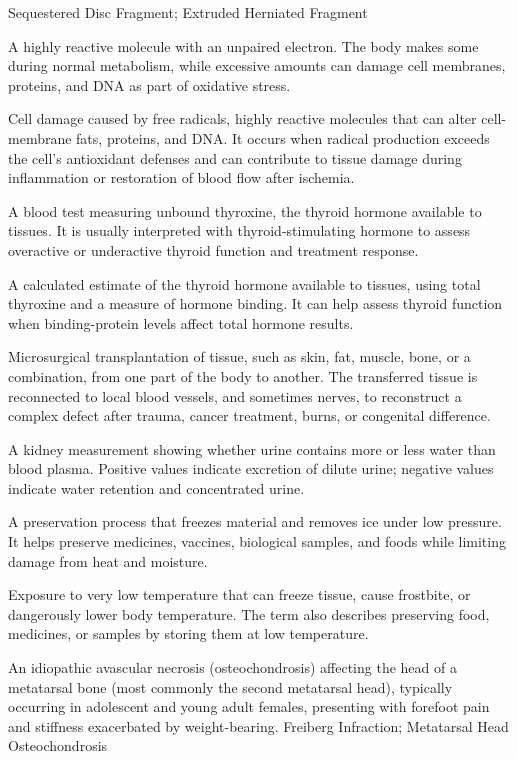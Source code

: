\synonyms
Sequestered Disc Fragment; Extruded Herniated Fragment

 A highly reactive molecule with an unpaired electron. The body makes some during normal metabolism, while excessive amounts can damage cell membranes, proteins, and DNA as part of oxidative stress.

 Cell damage caused by free radicals, highly reactive molecules that can alter cell-membrane fats, proteins, and DNA. It occurs when radical production exceeds the cell's antioxidant defenses and can contribute to tissue damage during inflammation or restoration of blood flow after ischemia.

 A blood test measuring unbound thyroxine, the thyroid hormone available to tissues. It is usually interpreted with thyroid-stimulating hormone to assess overactive or underactive thyroid function and treatment response.

 A calculated estimate of the thyroid hormone available to tissues, using total thyroxine and a measure of hormone binding. It can help assess thyroid function when binding-protein levels affect total hormone results.

 Microsurgical transplantation of tissue, such as skin, fat, muscle, bone, or a combination, from one part of the body to another. The transferred tissue is reconnected to local blood vessels, and sometimes nerves, to reconstruct a complex defect after trauma, cancer treatment, burns, or congenital difference.

 A kidney measurement showing whether urine contains more or less water than blood plasma. Positive values indicate excretion of dilute urine; negative values indicate water retention and concentrated urine.

 A preservation process that freezes material and removes ice under low pressure. It helps preserve medicines, vaccines, biological samples, and foods while limiting damage from heat and moisture.

 Exposure to very low temperature that can freeze tissue, cause frostbite, or dangerously lower body temperature. The term also describes preserving food, medicines, or samples by storing them at low temperature.

 An idiopathic avascular necrosis (osteochondrosis) affecting the head of a metatarsal bone (most commonly the second metatarsal head), typically occurring in adolescent and young adult females, presenting with forefoot pain and stiffness exacerbated by weight-bearing.
\synonyms
Freiberg Infraction; Metatarsal Head Osteochondrosis

